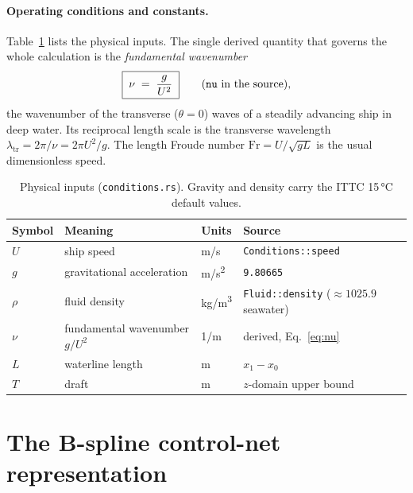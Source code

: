 \documentclass[11pt]{article}
\begin{document}
\paragraph{Operating conditions and constants.}
Table~\ref{tab:constants} lists the physical inputs. The single derived quantity
that governs the whole calculation is the \emph{fundamental wavenumber}
\begin{equation}
  \boxed{\;\nu \;=\; \frac{g}{U^{2}}\;}
  \qquad\text{(\texttt{nu} in the source),}
  \label{eq:nu}
\end{equation}
the wavenumber of the transverse ($\theta = 0$) waves of a steadily advancing
ship in deep water. Its reciprocal length scale is the transverse wavelength
$\lambda_{\mathrm{tr}} = 2\pi/\nu = 2\pi U^{2}/g$. The length Froude number
$\mathrm{Fr} = U/\sqrt{gL}$ is the usual dimensionless speed.

\begin{table}[h]
  \centering
  \begin{tabular}{llll}
    \toprule
    Symbol & Meaning & Units & Source \\
    \midrule
    $U$   & ship speed                 & \si{m/s}       & \texttt{Conditions::speed} \\
    $g$   & gravitational acceleration & \si{m/s^2}     & \texttt{9.80665} \\
    $\rho$& fluid density              & \si{kg/m^3}    & \texttt{Fluid::density} ($\approx 1025.9$ seawater) \\
    $\nu$ & fundamental wavenumber $g/U^2$ & \si{1/m}   & derived, Eq.~\eqref{eq:nu} \\
    $L$   & waterline length           & \si{m}         & $x_1 - x_0$ \\
    $T$   & draft                      & \si{m}         & $z$-domain upper bound \\
    \bottomrule
  \end{tabular}
  \caption{Physical inputs (\texttt{conditions.rs}). Gravity and density carry
  the ITTC 15\,\si{\celsius} default values.}
  \label{tab:constants}
\end{table}

\section{The B-spline control-net representation}
\label{sec:bspline}
\end{document}
